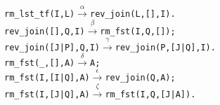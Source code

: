 \begin{alltt}
rm_lst_tf(I,L)      \(\xrightarrow{\alpha}\) rev_join(L,[],I).
rev_join(   [],Q,I) \(\xrightarrow{\beta}\) rm_fst(I,Q,[]);
rev_join([J|P],Q,I) \(\xrightarrow{\gamma}\) rev_join(P,[J|Q],I).
rm_fst(_,   [],A)   \(\xrightarrow{\delta}\) A;
rm_fst(I,[I|Q],A)   \(\xrightarrow{\epsilon}\) rev_join(Q,A);
rm_fst(I,[J|Q],A)   \(\xrightarrow{\zeta}\) rm_fst(I,Q,[J|A]).
\end{alltt}
